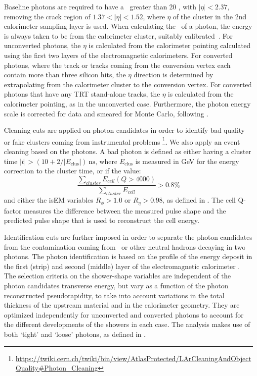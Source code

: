 Baseline photons are required to have a \pt\ greater than 20 \gev, with
$|\eta| < 2.37$, removing the crack region of $1.37 < |\eta| < 1.52$,
where $\eta$ of the cluster in the 2nd calorimeter sampling layer is used.
When calculating the \pt\ of a photon, the
energy is always taken to be from the calorimeter cluster, suitably
calibrated~\cite{Banfi:1259219}. For unconverted photons, the $\eta$
is calculated from the calorimeter pointing calculated using the first
two layers of the electromagnetic calorimeters. For converted photons, where the track
or tracks coming from the conversion vertex each contain more than
three silicon hits, the $\eta$ direction is determined by
extrapolating from the calorimeter cluster to the conversion vertex.
For converted photons that have any TRT stand-alone tracks, the
$\eta$ is calculated from the calorimeter pointing, as in the
unconverted case. Furthermore, the photon energy scale is corrected
for data and smeared for Monte Carlo, following
\Ref \cite{EGScaleTwiki}.

Cleaning cuts are applied on photon candidates in order to identify bad quality or fake clusters coming from instrumental
problems \footnote{\url{https://twiki.cern.ch/twiki/bin/view/AtlasProtected/LArCleaningAndObjectQuality\#Photon_Cleaning}}.
We also apply an event cleaning based on the photons. A bad photon is
defined as either having a cluster time
$|t|>(10+2/|E_\mathrm{clus}|)~\mathrm{ns}$, where $E_\mathrm{clus}$ is
measured in GeV for the energy correction to the cluster time, or if
the value:
\begin{equation}
  \frac{\sum_{cluster} E_{cell}(Q>4000)}{\sum_{cluster} E_{cell} } > 0.8\%
\end{equation}
and either the isEM variables $R_\phi > 1.0$ or $R_\eta > 0.98$, as
defined in \Ref \cite{PhotonCleaning}. The
cell Q-factor measures the difference between the measured pulse shape
and the predicted pulse shape that is used to reconstruct the cell energy.

Identification cuts are further imposed in order to separate the photon candidates from the contamination coming
from \pizero\ or other neutral hadrons decaying in two photons. The photon identification is based on the profile
of the energy deposit in the first (strip) and second (middle) layer of the electromagnetic calorimeter \cite{ATL-PHYS-PUB-2011-007}.
The selection criteria on the shower-shape variables are
independent of the photon candidates transverse energy,
but vary as a function of the photon reconstructed pseudorapidity, to take into account variations in the total
thickness of the upstream material and in the calorimeter
geometry. They are optimized independently for unconverted and converted photons to account for the different developments of the showers in each case.
The analysis makes use of both `tight' and `loose' photons, as
defined in \cite{ATL-PHYS-PUB-2011-007}.

